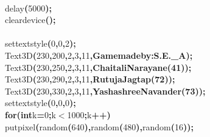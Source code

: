 \documentclass[a4paper, 10pt]{article}
\newcommand\SPC{\hspace*{0.6em}}
\newcommand\QOT{\mbox{\char 34}}
\newcommand{\CppAIdentifier}[1]{#1}
\newcommand{\CppANumber}[1]{\textcolor[rgb]{0.5,0,0.5}{#1}}
\newcommand{\CppAReservedWord}[1]{\textbf{#1}}
\newcommand{\CppASpace}[1]{\colorbox[rgb]{1,1,1}{#1}}
\newcommand{\CppAString}[1]{\textbf{\textcolor[rgb]{0,0,1}{#1}}}
\newcommand{\CppASymbol}[1]{\textbf{\textcolor[rgb]{1,0,0}{#1}}}
\begin{document}
\begin{ttfamily}
\\
\CppASpace{\SPC \SPC \SPC }\CppAIdentifier{delay}\CppASymbol{(}\CppANumber{5000}\CppASymbol{)}\CppASymbol{;}\\
\CppASpace{\SPC \SPC \SPC }\CppAIdentifier{cleardevice}\CppASymbol{(}\CppASymbol{)}\CppASymbol{;}\\
\\
\CppASpace{\SPC \SPC \SPC }\CppAIdentifier{settextstyle}\CppASymbol{(}\CppANumber{0}\CppASymbol{,}\CppANumber{0}\CppASymbol{,}\CppANumber{2}\CppASymbol{)}\CppASymbol{;}\\
\CppASpace{\SPC \SPC \SPC }\CppAIdentifier{Text3D}\CppASymbol{(}\CppANumber{230}\CppASymbol{,}\CppANumber{200}\CppASymbol{,}\CppANumber{2}\CppASymbol{,}\CppANumber{3}\CppASymbol{,}\CppANumber{11}\CppASymbol{,}\CppAString{\QOT Game\SPC made\SPC by:\SPC S.E.\_A\QOT }\CppASymbol{)}\CppASymbol{;}\\
\CppASpace{\SPC \SPC \SPC }\CppAIdentifier{Text3D}\CppASymbol{(}\CppANumber{230}\CppASymbol{,}\CppANumber{250}\CppASymbol{,}\CppANumber{2}\CppASymbol{,}\CppANumber{3}\CppASymbol{,}\CppANumber{11}\CppASymbol{,}\CppAString{\QOT Chaitali\SPC Narayane\SPC (41)\QOT }\CppASymbol{)}\CppASymbol{;}\\
\CppASpace{\SPC \SPC \SPC }\CppAIdentifier{Text3D}\CppASymbol{(}\CppANumber{230}\CppASymbol{,}\CppANumber{290}\CppASymbol{,}\CppANumber{2}\CppASymbol{,}\CppANumber{3}\CppASymbol{,}\CppANumber{11}\CppASymbol{,}\CppAString{\QOT Rutuja\SPC Jagtap\SPC (72)\QOT }\CppASymbol{)}\CppASymbol{;}\\
\CppASpace{\SPC \SPC \SPC }\CppAIdentifier{Text3D}\CppASymbol{(}\CppANumber{230}\CppASymbol{,}\CppANumber{330}\CppASymbol{,}\CppANumber{2}\CppASymbol{,}\CppANumber{3}\CppASymbol{,}\CppANumber{11}\CppASymbol{,}\CppAString{\QOT Yashashree\SPC Navander\SPC (73)\QOT }\CppASymbol{)}\CppASymbol{;}\\
\CppASpace{\SPC \SPC \SPC }\CppAIdentifier{settextstyle}\CppASymbol{(}\CppANumber{0}\CppASymbol{,}\CppANumber{0}\CppASymbol{,}\CppANumber{0}\CppASymbol{)}\CppASymbol{;}\\
\CppASpace{\SPC \SPC \SPC }\CppAReservedWord{for}\CppASymbol{(}\CppAReservedWord{int}\CppASpace{\SPC }\CppAIdentifier{k}\CppASymbol{=}\CppANumber{0}\CppASymbol{;}\CppAIdentifier{k}\CppASymbol{$<$}\CppANumber{1000}\CppASymbol{;}\CppAIdentifier{k}\CppASymbol{++}\CppASymbol{)}\\
\CppASpace{\SPC }\CppAIdentifier{putpixel}\CppASymbol{(}\CppAIdentifier{random}\CppASymbol{(}\CppANumber{640}\CppASymbol{)}\CppASymbol{,}\CppAIdentifier{random}\CppASymbol{(}\CppANumber{480}\CppASymbol{)}\CppASymbol{,}\CppAIdentifier{random}\CppASymbol{(}\CppANumber{16}\CppASymbol{)}\CppASymbol{)}\CppASymbol{;}\\

\end{ttfamily}
\end{document}
